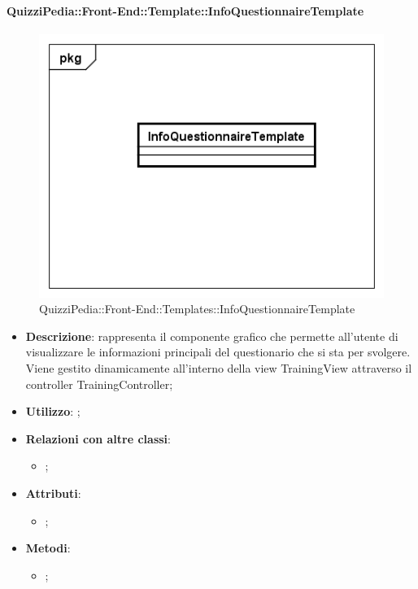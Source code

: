 		\paragraph{QuizziPedia::Front-End::Template::InfoQuestionnaireTemplate}
		
		\label{QuizziPedia::Front-End::Templates::InfoQuestionnaireTemplate}
		
		\begin{figure}[h]
			\centering
			\includegraphics[scale=0.5,keepaspectratio]{UML/Classi/Front-End/QuizziPedia_Front-end_Templates_InfoQuestionnaireTemplate.png}
			\caption{QuizziPedia::Front-End::Templates::InfoQuestionnaireTemplate}
		\end{figure}
		
		\begin{itemize}
			\item \textbf{Descrizione}: rappresenta il componente grafico che permette all'utente di visualizzare le informazioni principali del questionario che si sta per svolgere. Viene gestito dinamicamente all'interno della view TrainingView attraverso il controller TrainingController;
			\item \textbf{Utilizzo}: ;
			\item \textbf{Relazioni con altre classi}: 
			\begin{itemize}
				\item ;
			\end{itemize}
			\item \textbf{Attributi}: 
			\begin{itemize}
				\item ;
			\end{itemize}
			\item \textbf{Metodi}: 
			\begin{itemize}
				\item ;
			\end{itemize}
		\end{itemize}
		
